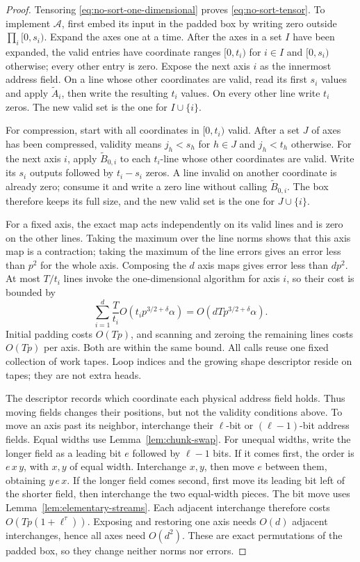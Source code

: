 \begin{proof}
Tensoring \eqref{eq:no-sort-one-dimensional} proves
\eqref{eq:no-sort-tensor}. To implement $\mathcal A$, first embed its
input in the padded box by writing zero outside
$\prod_i[0,s_i)$. Expand the axes one at a time. After the axes in a set
$I$ have been expanded, the valid entries have coordinate ranges
$[0,t_i)$ for $i\in I$ and $[0,s_i)$ otherwise; every other entry is
zero. Expose the next axis $i$ as the innermost address field. On a line
whose other coordinates are valid, read its first $s_i$ values and apply
$\widetilde A_i$, then write the resulting $t_i$ values. On every other
line write $t_i$ zeros. The new valid set is the one for $I\cup\{i\}$.

For compression, start with all coordinates in $[0,t_i)$ valid.
After a set $J$ of axes has been compressed, validity means
$j_h<s_h$ for $h\in J$ and $j_h<t_h$ otherwise. For the next axis $i$,
apply $\widetilde B_{0,i}$ to each $t_i$-line whose other coordinates
are valid. Write its $s_i$ outputs followed by $t_i-s_i$ zeros.
A line invalid on another coordinate is already zero; consume it and
write a zero line without calling $\widetilde B_{0,i}$. The box therefore
keeps its full size, and the new valid set is the one for $J\cup\{i\}$.

For a fixed axis, the exact map acts independently on its valid lines
and is zero on the other lines. Taking the maximum over the line norms
shows that this axis map is a contraction; taking the maximum of the
line errors gives an error less than $p^2$ for the whole axis.
Composing the $d$ axis maps gives error less than $dp^2$.
At most $T/t_i$ lines invoke the one-dimensional algorithm for axis $i$,
so their cost is bounded by
\[
 \sum_{i=1}^d\frac{T}{t_i}
           O(t_i p^{3/2+\delta}\alpha)
   =O(dTp^{3/2+\delta}\alpha).
\]
Initial padding costs $O(Tp)$, and scanning and zeroing the remaining
lines costs $O(Tp)$ per axis. Both are within the same bound.
All calls reuse one fixed collection of work
tapes. Loop indices and the growing shape descriptor reside on tapes;
they are not extra heads.

The descriptor records which coordinate each physical address field
holds. Thus moving fields changes their positions, but not the validity
conditions above. To move an axis past its neighbor, interchange their
$\ell$-bit or $(\ell-1)$-bit address fields. Equal widths use
Lemma~\ref{lem:chunk-swap}. For unequal widths, write the longer field as
a leading bit $e$ followed by $\ell-1$ bits. If it comes first, the order
is $e\,x\,y$, with $x,y$ of equal width. Interchange $x,y$, then move $e$
between them, obtaining $y\,e\,x$. If the longer field comes second,
first move its leading bit left of the shorter field, then interchange
the two equal-width pieces. The bit move uses
Lemma~\ref{lem:elementary-streams}. Each adjacent interchange therefore
costs $O(Tp(1+\ell^\tau))$. Exposing and restoring one axis needs
$O(d)$ adjacent interchanges, hence all axes need $O(d^2)$. These are
exact permutations of the padded box, so they change neither norms nor
errors.


\end{proof}
